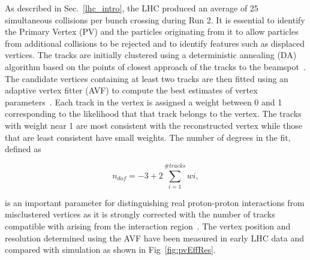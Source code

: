 As described in Sec.~\ref{lhc_intro}, the LHC produced an average of 25 simultaneous collisions per bunch crossing
during Run 2. It is essential to identify the Primary Vertex (PV) and the particles originating from it to allow 
particles from additional collisions to be rejected and to identify features such as displaced vertices. The tracks
are initially clustered using a deterministic annealing (DA) algorithm based on the points of closest approach of the 
tracks to the beamspot~\cite{tracker_vertex}. The candidate vertices containing at least two tracks are then
fitted using an adaptive vertex fitter (AVF) to compute the best estimates of vertex parameters~\cite{tracker_avf}. 
Each track in the vertex is assigned a weight between 0 and 1 corresponding to the likelihood that that track
belongs to the vertex. The tracks with weight near 1 are most consistent with the reconstructed vertex while
those that are least consistent have small weights. The number of degrees in the fit, defined as 

\begin{equation}
n_{dof} = -3 + 2 \sum_{i=1}^{\#tracks} wi,
\end{equation}

is an important parameter for distinguishing real proton-proton interactions from misclustered vertices as it is strongly corrected with
the number of tracks compatible with arising from the interaction region~\cite{tracker_vertex}. The vertex
position and resolution determined using the AVF have been 
measured in early LHC data and compared with simulation as shown in Fig~\ref{fig:pvEffRes}.

